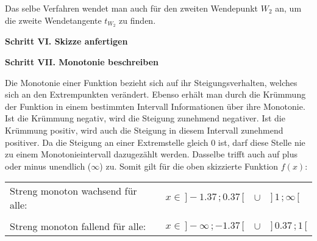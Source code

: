 Das selbe Verfahren wendet man auch f\"{u}r den zweiten Wendepunkt $W_{2}$ an, um die zweite Wendetangente $t_{W_{2}}$ zu finden.

\textbf{Schritt VI. Skizze anfertigen}

\begin{figure}[h!]
\end{figure}

\textbf{Schritt VII. Monotonie beschreiben}

Die Monotonie einer Funktion bezieht sich auf ihr Steigungsverhalten, welches sich an den Extrempunkten ver\"{a}ndert. Ebenso erh\"{a}lt man durch die Kr\"{u}mmung der Funktion in einem bestimmten Intervall Informationen \"{u}ber ihre Monotonie. Ist die Kr\"{u}mmung negativ, wird die Steigung zunehmend negativer. Ist die Kr\"{u}mmung positiv, wird auch die Steigung in diesem Intervall zunehmend positiver. Da die Steigung an einer Extremstelle gleich 0 ist, darf diese Stelle nie zu einem Monotonieintervall dazugez\"{a}hlt werden. Dasselbe trifft auch auf plus oder minus unendlich ($\infty$) zu. Somit gilt f\"{u}r die oben skizzierte Funktion $f(x)$:

\begin{tabular}{l l l l}
	Streng monoton wachsend f\"{u}r alle: & $x \in \,] -1.37\,; 0.37\,[$ & $\cup$ & $]\, 1\,; \infty \, [$
	\\
	&&&
	\\
	Streng monoton fallend f\"{u}r alle: & $x \in \,] -\infty\,; -1.37\,[$ & $\cup$ & $] \, 0.37\,; 1 \, [$
\end{tabular}

\pagebreak

